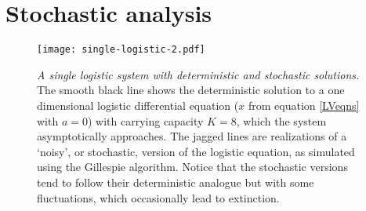 \section{Stochastic analysis}

\begin{figure}[h]
	\centering
	\texttt{[image: single-logistic-2.pdf]}
	\caption{\emph{A single logistic system with deterministic and stochastic solutions.} The smooth black line shows the deterministic solution to a one dimensional logistic differential equation ($x$ from equation \ref{LVeqns} with $a=0$) with carrying capacity $K=8$, which the system asymptotically approaches. The jagged lines are realizations of a `noisy', or stochastic, version of the logistic equation, as simulated using the Gillespie algorithm. Notice that the stochastic versions tend to follow their deterministic analogue but with some fluctuations, which occasionally lead to extinction. }%
\end{figure} \label{singlelogfig}

